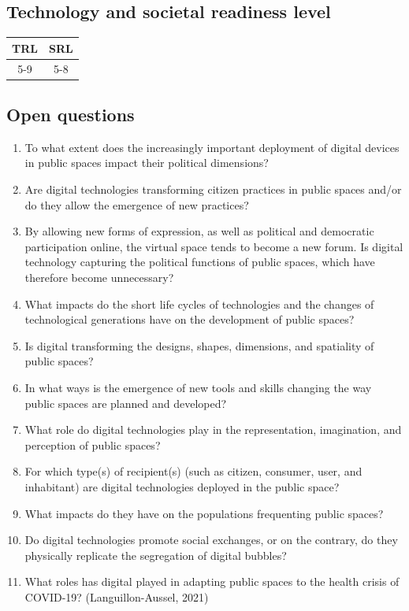 \documentclass[
]{book}
\providecommand{\tightlist}{%
  \setlength{\itemsep}{0pt}\setlength{\parskip}{0pt}}
\begin{document}
\hypertarget{technology-and-societal-readiness-level-5}{%
\subsection*{Technology and societal readiness level}\label{technology-and-societal-readiness-level-5}}

\begin{longtable}[]{@{}cc@{}}
\toprule
TRL & SRL\tabularnewline
\midrule
\endhead
5-9 & 5-8\tabularnewline
\bottomrule
\end{longtable}

\hypertarget{open-questions-5}{%
\subsection*{Open questions}\label{open-questions-5}}

\begin{enumerate}
\def\labelenumi{\arabic{enumi}.}
\tightlist
\item
  To what extent does the increasingly important deployment of digital devices in public spaces impact their political dimensions?
\item
  Are digital technologies transforming citizen practices in public spaces and/or do they allow the emergence of new practices?
\item
  By allowing new forms of expression, as well as political and democratic participation online, the virtual space tends to become a new forum. Is digital technology capturing the political functions of public spaces, which have therefore become unnecessary?
\item
  What impacts do the short life cycles of technologies and the changes of technological generations have on the development of public spaces?
\item
  Is digital transforming the designs, shapes, dimensions, and spatiality of public spaces?
\item
  In what ways is the emergence of new tools and skills changing the way public spaces are planned and developed?
\item
  What role do digital technologies play in the representation, imagination, and perception of public spaces?
\item
  For which type(s) of recipient(s) (such as citizen, consumer, user, and inhabitant) are digital technologies deployed in the public space?
\item
  What impacts do they have on the populations frequenting public spaces?
\item
  Do digital technologies promote social exchanges, or on the contrary, do they physically replicate the segregation of digital bubbles?
\item
  What roles has digital played in adapting public spaces to the health crisis of COVID-19?
  (Languillon-Aussel, 2021)
\end{enumerate}
\end{document}
